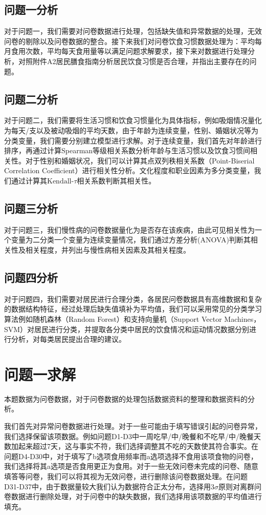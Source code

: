 \documentclass{cumcmthesis}
\begin{document}
\subsection{问题一分析}
对于问题一，我们需要对问卷数据进行处理，包括缺失值和异常数据的处理，无效问卷的剔除以及问卷数据的整合。接下来我们对问卷饮食习惯数据处理为：平均每月食用次数，平均每天食用量等以满足问题求解要求，接下来对数据进行处理分析，对照附件A2居民膳食指南分析居民饮食习惯是否合理，并指出主要存在的问题。
\subsection{问题二分析}
对于问题二，我们需要将生活习惯和饮食习惯量化为具体指标，例如吸烟情况量化为每天/支以及被动吸烟的平均天数，由于年龄为连续变量，性别、婚姻状况等为分类变量，我们需要分别建立模型进行求解。对于连续变量，我们首先对年龄进行排序，再通过计算Spearman等级相关系数分析年龄与生活习惯以及饮食习惯间相关性。对于性别和婚姻状况，我们可以计算其点双列秩相关系数（Point-Biserial Correlation Coefficient）进行相关性分析。文化程度和职业因素为多分类变量，我们通过计算其$\text{Kendall-}\tau$相关系数判断其相关性。
\subsection{问题三分析}
对于问题三，我们慢性病的问卷数据量化为是否存在该疾病，由此可见相关性为一个变量为二分类一个变量为连续变量情况，我们通过方差分析(ANOVA)判断其相关性及相关程度，并列出与慢性病相关因素及其相关程度。
\subsection{问题四分析}
对于问题四，我们需要对居民进行合理分类，各居民问卷数据具有高维数据和复杂的数据结构特征，经过处理后缺失值填补为平均值，我们可以采用常见的分类学习算法例如随机森林（Random Forest）和支持向量机（Support Vector Machines，SVM）对居民进行分类，并提取各分类中居民的饮食情况和运动情况数据分别进行分析，对每类居民提出合理的建议。
\section{问题一求解}
本题数据为问卷数据，对于问卷数据的处理包括数据资料的整理和数据资料的分析。

我们首先对异常问卷数据进行处理。对于一些可能由于填写错误引起的问卷异常，我们选择保留该项数据。例如问题D1-D3中一周吃早/中/晚餐和不吃早/中/晚餐天数加起来超过7天，这与事实不符，我们选择调整其不吃的天数使其符合事实。在问题D4-D30中，对于填写了b选项食用频率而a选项选择不食用该项食物的问卷，我们选择将其a选项是否食用更正为食用。对于一些无效问卷未完成的问卷、随意填答等问卷，我们可以将其视为无效问卷，进行删除该问卷数据处理。在问题D31-D37中，由于数据量较大我们认为数据符合正太分布，选择用$3\sigma$原则对离群问卷数据进行删除处理，对于问卷中的缺失数据，我们选择用该项数据的平均值进行填充。
\end{document}
